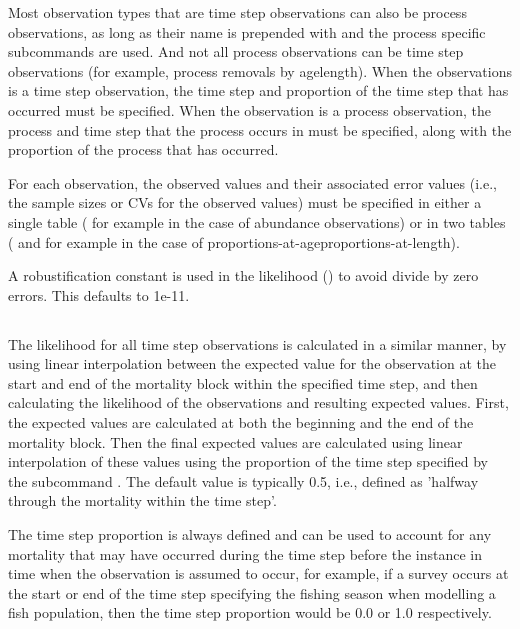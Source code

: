 Most observation types that are time step observations can also be process observations, as long as their name is prepended with  and the process specific subcommands are used. And not all process observations can be time step observations (for example, process removals by \ifAgeBased age\else length\fi). When the observations is a time step observation, the time step and proportion of the time step that has occurred must be specified. When the observation is a process observation, the process and time step that the process occurs in must be specified, along with the proportion of the process that has occurred.

For each observation, the observed values and their associated error values (i.e., the sample sizes or CVs for the observed values) must be specified in either a single table ( for example in the case of abundance observations) or in two tables ( and  for example in the case of \ifAgeBased proportions-at-age\else proportions-at-length\fi). 

A robustification constant is used in the likelihood () to avoid divide by zero errors. This defaults to 1e-11. 

\subsection{ \label{sec:TimeStepObservations} \label{sec:MortalityBlockObservations}}

The likelihood for all time step observations is calculated in a similar manner, by using linear interpolation between the expected value for the observation at the start and end of the mortality block within the specified time step, and then calculating the likelihood of the observations and resulting expected values. First, the expected values are calculated at both the beginning and the end of the mortality block. Then the final expected values are calculated using linear interpolation of these values using the proportion of the time step specified by the subcommand . The default value is typically 0.5, i.e., defined as 'halfway through the mortality within the time step'.

The time step proportion is always defined and can be used to account for any mortality that may have occurred during the time step before the instance in time when the observation is assumed to occur, for example, if a survey occurs at the start or end of the time step specifying the fishing season when modelling a fish population, then the time step proportion would be 0.0 or 1.0 respectively.

